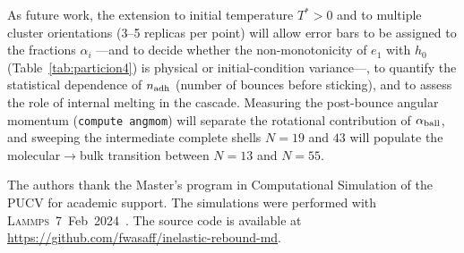 \documentclass[aps,pre,twocolumn,reprint,superscriptaddress]{revtex4-2}
\newcommand{\Tstar}{T^*}
\newcommand{\lammps}{\textsc{Lammps}}
\begin{document}
As future work, the extension to initial temperature $\Tstar>0$ and to
multiple cluster orientations (3--5 replicas per point) will allow error
bars to be assigned to the fractions $\alpha_i$ ---and to decide whether
the non-monotonicity of $e_1$ with $h_0$ (Table~\ref{tab:particion4}) is
physical or initial-condition variance---, to quantify the statistical
dependence of $n_{\rm adh}$ (number of bounces before sticking), and to
assess the role of internal melting in the cascade. Measuring the
post-bounce angular momentum (\texttt{compute angmom}) will separate the
rotational contribution of $\alpha_{\rm ball}$, and sweeping the
intermediate complete shells $N=19$ and $43$ will populate the
molecular$\to$bulk transition between $N=13$ and $N=55$.

\begin{acknowledgments}
The authors thank the Master's program in Computational Simulation of the
PUCV for academic support. The simulations were performed with
\lammps~7~Feb~2024~\cite{Thompson2022}. The source code is available at
\url{https://github.com/fwasaff/inelastic-rebound-md}.
\end{acknowledgments}
\end{document}
